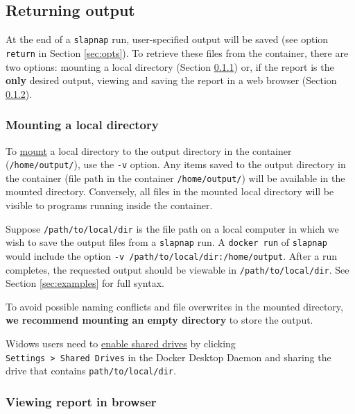 \documentclass[]{article}
\begin{document}
\subsection{Returning output}\label{returning-output}

At the end of a \texttt{slapnap} run, user-specified output will be
saved (see option \texttt{return} in Section \ref{sec:opts}). To
retrieve these files from the container, there are two options: mounting
a local directory (Section \ref{sec:mounting}) or, if the report is the
\textbf{only} desired output, viewing and saving the report in a web
browser (Section \ref{sec:viewreport}).

\subsubsection{Mounting a local directory}\label{sec:mounting}

To \href{https://docs.docker.com/storage/bind-mounts/}{mount} a local
directory to the output directory in the container
(\texttt{/home/output/}), use the \texttt{-v} option. Any items saved to
the output directory in the container (file path in the container
\texttt{/home/output/}) will be available in the mounted directory.
Conversely, all files in the mounted local directory will be visible to
programs running inside the container.

Suppose \texttt{/path/to/local/dir} is the file path on a local computer
in which we wish to save the output files from a \texttt{slapnap} run. A
\texttt{docker\ run} of \texttt{slapnap} would include the option
\texttt{-v\ /path/to/local/dir:/home/output}. After a run completes, the
requested output should be viewable in \texttt{/path/to/local/dir}. See
Section \ref{sec:examples} for full syntax.

To avoid possible naming conflicts and file overwrites in the mounted
directory, \textbf{we recommend mounting an empty directory} to store
the output.

Widows users need to
\href{https://docs.docker.com/docker-for-windows/troubleshoot/\#volume-mounting-requires-shared-drives-for-linux-containers}{enable
shared drives} by clicking
\texttt{Settings\ \textgreater{}\ Shared\ Drives} in the Docker Desktop
Daemon and sharing the drive that contains \texttt{path/to/local/dir}.

\subsubsection{Viewing report in browser}\label{sec:viewreport}
\end{document}
